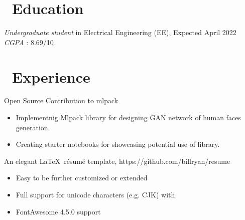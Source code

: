 \documentclass{resume}
\begin{document}



\section{\faGraduationCap\ Education}
\textit{Undergraduate student} in Electrical Engineering (EE), Expected April 2022 \\
\textit {CGPA} : 8.69/10

\section{\faUsers\ Experience}
\role{Student Developer} 
Open Source Contribution to mlpack
\begin{itemize}
  \item Implementnig Mlpack library for designing GAN network of human faces generation. 
  \item Creating starter notebooks for showcasing potential use of library. 
\end{itemize}


An elegant \LaTeX\ résumé template, https://github.com/billryan/resume
\begin{itemize}
  \item Easy to be further customized or extended
  \item Full support for unicode characters (e.g. CJK) with \XeLaTeX\
  \item FontAwesome 4.5.0 support
\end{itemize}
\end{document}
